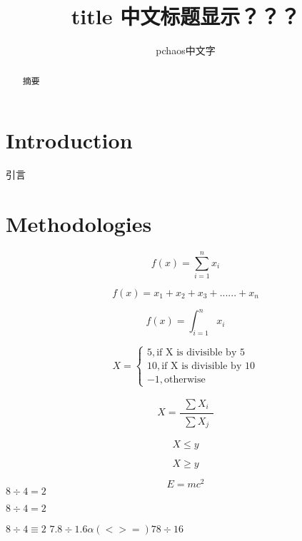 \documentclass[a4paper,11pt]{article}
\title{title 中文标题显示？？？ }
\author{pchaos中文字}
\begin{document}
\begin{CJK}{UTF8}{gkai}
\maketitle
\tableofcontents

\newpage
\begin{abstract}
摘要
\end{abstract}

\newpage
\section{Introduction}
引言\cite{sample1}


\section{Methodologies}
\begin{equation}
	f(x) = \sum_{i=1}^{n} {x_i}
\end{equation}

\begin{equation}
	f(x) = x_1 + x_2 + x_3 + ...... + x_n
\end{equation}

\begin{equation}
	f(x) = \int_{i=1}^{n} {x_i}
\end{equation}

\begin{equation}
	X=
	\begin{cases}
	5, \text{if X is divisible by 5}
	\\
	10, \text{if X is divisible by 10}
	\\
	-1, \text{otherwise}
	\end{cases}
\end{equation}

\begin{equation}
	X = 
	\frac{\substack{\sum{X_i}}}
	{\substack{\sum{X_j}}}
\end{equation}

\begin{equation}
	X \leqslant y %
\end{equation}

\begin{equation}
	X \geqslant y %
\end{equation}

\[ E=mc^2 \]
$8\div4=2$

$8\div4=2$

  $ 8\div 4\equiv 2 $
\begin{math}
 7.8\div1.6 \alpha( < > = ) 78 \div16 \end
 {math} 
 

\end{CJK}
\end{document}
